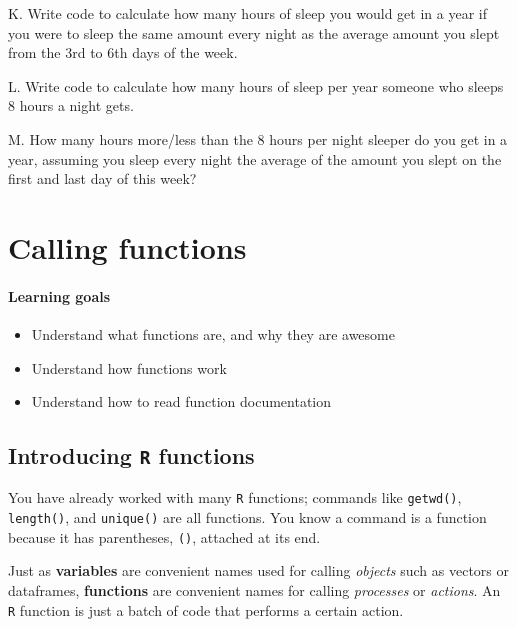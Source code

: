 \documentclass[
]{book}
\providecommand{\tightlist}{%
  \setlength{\itemsep}{0pt}\setlength{\parskip}{0pt}}
\begin{document}
K. Write code to calculate how many hours of sleep you would get in a year if you were to sleep the same amount every night as the average amount you slept from the 3rd to 6th days of the week.

L. Write code to calculate how many hours of sleep per year someone who sleeps 8 hours a night gets.

M. How many hours more/less than the 8 hours per night sleeper do you get in a year, assuming you sleep every night the average of the amount you slept on the first and last day of this week?

\hypertarget{calling_functions}{%
\chapter{Calling functions}\label{calling_functions}}

\hypertarget{learning-goals-4}{%
\subsubsection*{Learning goals}\label{learning-goals-4}}

\begin{itemize}
\tightlist
\item
  Understand what functions are, and why they are awesome
\item
  Understand how functions work
\item
  Understand how to read function documentation
\end{itemize}

\hypertarget{introducing-r-functions}{%
\section*{\texorpdfstring{Introducing \texttt{R} functions}{Introducing R functions}}\label{introducing-r-functions}}

You have already worked with many \texttt{R} functions; commands like \texttt{getwd()}, \texttt{length()}, and \texttt{unique()} are all functions. You know a command is a function because it has parentheses, \texttt{()}, attached at its end.

Just as \textbf{variables} are convenient names used for calling \emph{objects} such as vectors or dataframes, \textbf{functions} are convenient names for calling \emph{processes} or \emph{actions}. An \texttt{R} function is just a batch of code that performs a certain action.
\end{document}
